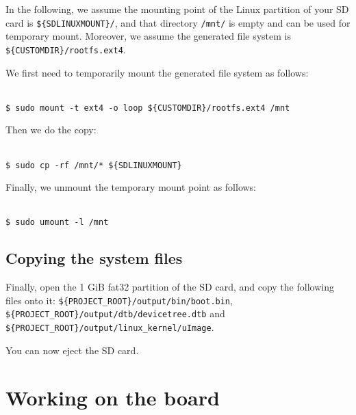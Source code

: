 \documentclass[openany,a4paper]{book}
\begin{document}
In the following, we assume the mounting point of the Linux partition of your SD card is \nolinkurl{${SDLINUXMOUNT}/}, and that directory \nolinkurl{/mnt/} is empty and can be used for temporary mount.
Moreover, we assume the generated file system is \nolinkurl{${CUSTOMDIR}/rootfs.ext4}.

We first need to temporarily mount the generated file system as follows:

\begin{tabbing}
\kill \hspace{1cm} \= \\
\> \texttt{\$ sudo mount -t ext4 -o loop \$\{CUSTOMDIR\}/rootfs.ext4 /mnt} \\
\end{tabbing}

Then we do the copy:

\begin{tabbing}
\kill \hspace{1cm} \= \\
\> \texttt{\$ sudo cp -rf /mnt/* \$\{SDLINUXMOUNT\}} \\
\end{tabbing}

Finally, we unmount the temporary mount point as follows:

\begin{tabbing}
\kill \hspace{1cm} \= \\
\> \texttt{\$ sudo umount -l /mnt} \\
\end{tabbing}

\section{Copying the system files}

Finally, open the 1 GiB fat32 partition of the SD card, and copy the following files onto it:
\nolinkurl{${PROJECT_ROOT}/output/bin/boot.bin}, \nolinkurl{${PROJECT_ROOT}/output/dtb/devicetree.dtb} and \nolinkurl{${PROJECT_ROOT}/output/linux_kernel/uImage}.

You can now eject the SD card.


\chapter{Working on the board}
\end{document}
